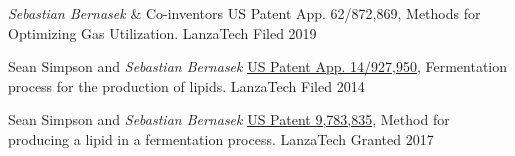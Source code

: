 

\begin{cventries}

  
  \cventrypub
    {\emph{Sebastian Bernasek} \& Co-inventors}
    {US Patent App. 62/872,869, Methods for Optimizing Gas Utilization.}
    {LanzaTech}
    {Filed 2019}    
  
  \cventrypub
    {Sean Simpson and \emph{Sebastian Bernasek}}
    {\href{https://patents.google.com/patent/US20160122787A1/en}{US Patent App. 14/927,950}, Fermentation process for the production of lipids.}
    {LanzaTech}
    {Filed 2014}
      
  \cventrypub
    {Sean Simpson and \emph{Sebastian Bernasek}}
    {\href{https://patents.google.com/patent/US9783835B2/en}{US Patent 9,783,835}, Method for producing a lipid in a fermentation process.}
    {LanzaTech}
    {Granted 2017} 
        
\end{cventries}
